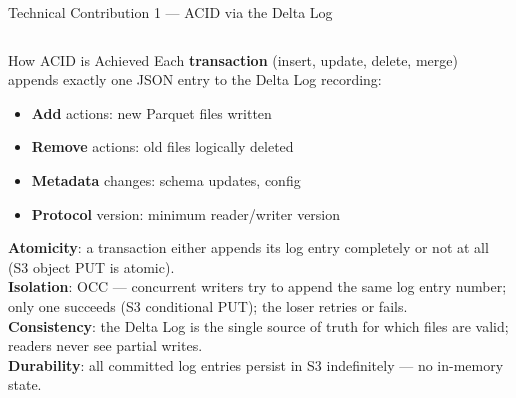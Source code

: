 \documentclass[aspectratio=169,10pt]{beamer}
\begin{document}
\begin{frame}{Technical Contribution 1 — ACID via the Delta Log}
  \begin{columns}[T]
      \begin{block}{How ACID is Achieved}
        Each \textbf{transaction} (insert, update, delete, merge)
        appends exactly one JSON entry to the Delta Log recording:
        \begin{itemize}
          \item \textbf{Add} actions: new Parquet files written
          \item \textbf{Remove} actions: old files logically deleted
          \item \textbf{Metadata} changes: schema updates, config
          \item \textbf{Protocol} version: minimum reader/writer version
        \end{itemize}
        \textbf{Atomicity}: a transaction either appends its log entry
        completely or not at all (S3 object PUT is atomic).\\[4pt]
        \textbf{Isolation}: OCC — concurrent writers try to append
        the same log entry number; only one succeeds (S3 conditional
        PUT); the loser retries or fails.\\[4pt]
        \textbf{Consistency}: the Delta Log is the single source of
        truth for which files are valid; readers never see partial writes.\\[4pt]
        \textbf{Durability}: all committed log entries persist in
        S3 indefinitely — no in-memory state.
      \end{block}


\end{columns}
\end{frame}
\end{document}
